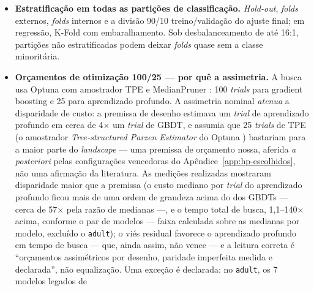 \begin{itemize}
    fixados, e o \emph{early stopping} das redes usa o próprio
    \emph{fold} em avaliação. Este desenho \emph{não} é a validação
    cruzada aninhada clássica --- nela, a busca se repetiria dentro de
    cada \emph{fold} externo. A consequência é circunscrita, e vale
    dizê-la com precisão: as métricas dos \emph{folds} externos são
    otimistas como estimativa de generalização, porque a seleção
    observou esses mesmos dados; elas cumprem aqui apenas papéis
    internos (estabilidade entre \emph{folds},
    Apêndice~\ref{app:tabelas}) e \textbf{nenhum resultado reportado
    sai delas} --- todos provêm do \emph{hold-out} prévio, que nenhum
    estágio de seleção jamais observa.
  \item \textbf{Estratificação em todas as partições de classificação.}
    \emph{Hold-out}, \emph{folds} externos, \emph{folds} internos e a
    divisão 90/10 treino/validação do ajuste final; em regressão, K-Fold
    com embaralhamento. Sob desbalanceamento de até 16:1, partições não
    estratificadas podem deixar \emph{folds} quase sem a classe minoritária.
  \item \textbf{Orçamentos de otimização 100/25 --- por quê a assimetria.}
    A busca usa Optuna com amostrador TPE e MedianPruner \citep{akiba2019}:
    100 \emph{trials} para gradient boosting e 25 para aprendizado profundo.
    A assimetria nominal \emph{atenua} a disparidade de custo: a premissa
    de desenho estimava um \emph{trial} de aprendizado profundo em cerca de
    4$\times$ um \emph{trial} de GBDT, e assumia que 25 \emph{trials} de
    TPE (o
    amostrador \emph{Tree-structured Parzen Estimator} do Optuna
    \citep{akiba2019}) bastariam para a maior parte do \emph{landscape}
    --- uma premissa de orçamento nossa, aferida \emph{a posteriori}
    pelas configurações vencedoras
    do Apêndice~\ref{app:hp-escolhidos}, não uma afirmação da
    literatura. As medições realizadas mostraram
    disparidade maior que a premissa (o custo mediano por \emph{trial}
    do aprendizado profundo ficou mais de uma ordem de grandeza acima
    do dos
    GBDTs --- cerca de 57$\times$ pela razão de medianas ---, e o
    tempo total de busca, 1,1--140$\times$ acima, conforme o
    par de modelos --- faixa calculada sobre as medianas por
    modelo, excluído o \texttt{adult}); o viés residual favorece o aprendizado profundo em
    tempo de busca --- que, ainda assim, não vence --- e a leitura
    correta é ``orçamentos assimétricos por desenho, paridade imperfeita
    medida e declarada'', não equalização. Uma
    exceção é declarada: no \texttt{adult}, os 7 modelos legados de

\end{itemize}
